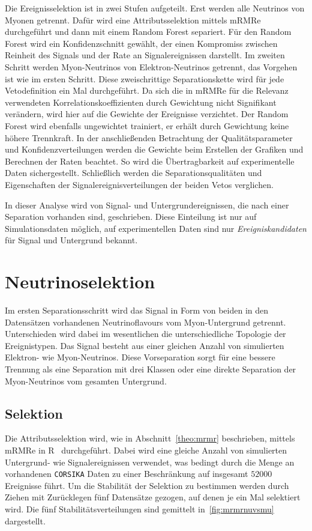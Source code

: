 Die Ereignisselektion ist in zwei Stufen aufgeteilt.
Erst werden alle Neutrinos von Myonen getrennt. 
Dafür wird eine Attributsselektion mittels mRMRe durchgeführt und dann mit einem Random Forest separiert.
Für den Random Forest wird ein Konfidenzschnitt gewählt, der einen Kompromiss zwischen Reinheit des Signals und der Rate an Signalereignissen darstellt.
Im zweiten Schritt werden Myon-Neutrinos von Elektron-Neutrinos getrennt, das Vorgehen ist wie im ersten Schritt.
Diese zweischrittige Separationskette wird für jede Vetodefinition ein Mal durchgeführt.
Da sich die in mRMRe für die Relevanz verwendeten Korrelationskoeffizienten durch Gewichtung nicht Signifikant verändern, wird hier auf die Gewichte der Ereignisse verzichtet.
Der Random Forest wird ebenfalls ungewichtet trainiert, er erhält durch Gewichtung keine höhere Trennkraft.
In der anschließenden Betrachtung der Qualitätsparameter und Konfidenzverteilungen werden die Gewichte beim Erstellen der Grafiken und Berechnen der Raten beachtet. 
So wird die Übertragbarkeit auf experimentelle Daten sichergestellt.
Schließlich werden die Separationsqualitäten und Eigenschaften der Signalereignisverteilungen der beiden Vetos verglichen.

In dieser Analyse wird von Signal- und Untergrundereignissen, die nach einer Separation vorhanden sind, geschrieben.
Diese Einteilung ist nur auf Simulationsdaten möglich, auf experimentellen Daten sind nur \emph{Ereigniskandidaten} für Signal und Untergrund bekannt.



\section{Neutrinoselektion}
\label{neutrinoselektion}
Im ersten Separationsschritt wird das Signal in Form von beiden in den Datensätzen vorhandenen Neutrinoflavours vom Myon-Untergrund getrennt.
Unterschieden wird dabei im wesentlichen die unterschiedliche Topologie der Ereignistypen.
Das Signal besteht aus einer gleichen Anzahl von simulierten Elektron- wie Myon-Neutrinos.
Diese Vorseparation sorgt für eine bessere Trennung als eine Separation mit drei Klassen oder eine direkte Separation der Myon-Neutrinos vom gesamten Untergrund.



\subsection{Selektion}
\label{neutrinomrmr}
Die Attributsselektion wird, wie in Abschnitt~\ref{theo:mrmr} beschrieben, mittels mRMRe in R~\cite{R} durchgeführt. 
Dabei wird eine gleiche Anzahl von simulierten Untergrund- wie Signalereignissen verwendet, was bedingt durch die Menge an vorhandenen \texttt{CORSIKA} Daten zu einer Beschränkung auf insgesamt $\num{52000}$ Ereignisse führt. 
Um die Stabilität der Selektion zu bestimmen werden durch Ziehen mit Zurücklegen fünf Datensätze gezogen, auf denen je ein Mal selektiert wird.
Die fünf Stabilitätsverteilungen sind gemittelt in~\ref{fig:mrmrnuvsmu} dargestellt.

